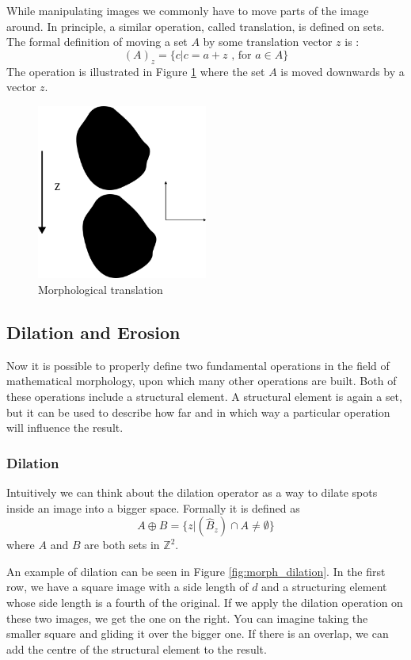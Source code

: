 \documentclass[
  digital,     %
  oneside,     %
  nosansbold,  %
  nocolorbold, %
  lof,         %
  lot,         %
]{fithesis4}
\newcommand*{\Z}{\ensuremath{\mathbb{Z}}}
\begin{document}
While manipulating images we commonly have to move parts of the image around.
In principle, a similar operation, called translation, is defined on sets. The
formal definition of moving a set $A$ by some translation vector $z$ is
\cite{gonzalez2002}:
$$(A)_z = \{c | c = a + z\text{ , for } a \in A\}$$
The operation is illustrated in Figure \ref{fig:morph_translation} where the set
$A$ is moved downwards by a vector $z$.
\begin{figure}
    \begin{center}
        \includegraphics[width=0.5\textwidth]{resources/inkscape/morphology-translation.png}
    \end{center}
    \caption{Morphological translation}
    \label{fig:morph_translation}
\end{figure}

\subsection{Dilation and Erosion}
Now it is possible to properly define two fundamental operations in the field of
mathematical morphology, upon which many other operations are built. Both of
these operations include a structural element. A structural element is again a
set, but it can be used to describe how far and in which way a particular
operation will influence the result.


\subsubsection{Dilation}
Intuitively we can think about the dilation operator as a way to dilate spots
inside an image into a bigger space. Formally it is defined as
\cite{gonzalez2002}
$$A \oplus B = \{z | (\hat{B}_z) \cap A \neq \emptyset\}$$
where $A$ and $B$ are both sets in $\Z^2$.

An example of dilation can be seen in Figure \ref{fig:morph_dilation}. In the
first row, we have a square image with a side length of $d$ and a structuring
element whose side length is a fourth of the original. If we apply the dilation
operation on these two images, we get the one on the right. You can imagine
taking the smaller square and gliding it over the bigger one. If there is an
overlap, we can add the centre of the structural element to the result.
\end{document}

